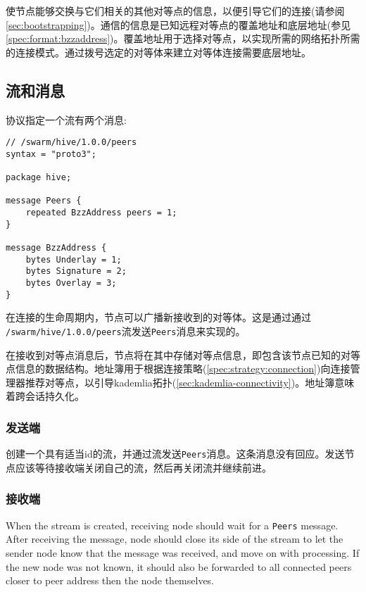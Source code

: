 使节点能够交换与它们相关的其他对等点的信息，以便引导它们的连接(请参阅\ref{sec:bootstrapping})。通信的信息是已知远程对等点的覆盖地址和底层地址(参见\ref{spec:format:bzzaddress})。覆盖地址用于选择对等点，以实现所需的网络拓扑所需的连接模式。通过拨号选定的对等体来建立对等体连接需要底层地址。

\subsection{流和消息\statusgreen}


协议指定一个流有两个消息:

\begin{definition}\label{def:hive-messages}

\begin{lstlisting}
// /swarm/hive/1.0.0/peers
syntax = "proto3";

package hive;

message Peers {
    repeated BzzAddress peers = 1;
}

message BzzAddress {
    bytes Underlay = 1;
    bytes Signature = 2;
    bytes Overlay = 3;
}

\end{lstlisting}
\end{definition}

在连接的生命周期内，节点可以广播新接收到的对等体。这是通过通过\\\lstinline{/swarm/hive/1.0.0/peers}流发送\lstinline{Peers}消息来实现的。

在接收到对等点消息后，节点将在其中存储对等点信息，即包含该节点已知的对等点信息的数据结构。地址簿用于根据连接策略(\ref{spec:strategy:connection})向连接管理器推荐对等点，以引导kademlia拓扑(\ref{sec:kademlia-connectivity})。地址簿意味着跨会话持久化。

\subsubsection{发送端}

创建一个具有适当id的流，并通过流发送\lstinline{Peers}消息。这条消息没有回应。发送节点应该等待接收端关闭自己的流，然后再关闭流并继续前进。

\subsubsection{接收端}

When the stream is created, receiving node should wait for a \lstinline{Peers} message. After receiving the message, node should close its side of the stream to let the sender node know that the message was received, and move on with processing. If the new node was not known, it should also be forwarded to all connected peers closer to peer address then the node themselves.